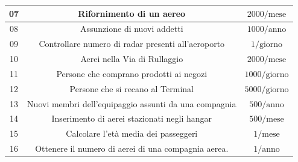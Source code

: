 \begin{tabular}{ | c c c |}
	
	
	
	
	\hline
	\textsf{\small 07} & \textsf{\small Rifornimento di un aereo} & \textsf{\small $ 2000/ \text{mese} $} \\
	\hline
	\textsf{\small 08} & \textsf{\small Assunzione di nuovi addetti} & \textsf{\small $ 1000 / \text{anno}$} \\
	\hline
	\textsf{\small 09} & \textsf{\small Controllare numero di radar presenti all'aeroporto} & \textsf{\small $ 1 / \text{giorno}$} \\
	\hline
	\textsf{\small 10} & \textsf{\small Aerei nella Via di Rullaggio} & \textsf{\small $ 2000 / \text{mese}$} \\
	\hline
	\textsf{\small 11} & \textsf{\small Persone che comprano prodotti ai negozi} & \textsf{\small $ 1000 / \text{giorno} $} \\
	\hline
	\textsf{\small 12} & \textsf{\small Persone che si recano al Terminal} & \textsf{\small $ 5000 / \text{giorno} $} \\
	\hline
	\textsf{\small 13} & \textsf{\small Nuovi membri dell'equipaggio assunti da una compagnia} & \textsf{\small $ 500 / \text{anno}$} \\ %
	\hline
	\textsf{\small 14} & \textsf{\small Inserimento di aerei stazionati negli hangar} & \textsf{\small $ 500 / \text{mese} $} \\ %
	\hline
	\textsf{\small 15} & \textsf{\small Calcolare l'età media dei passeggeri} & \textsf{\small $ 1 / \text{mese} $} \\
	\hline
	\textsf{\small 16} & \textsf{\small Ottenere il numero di aerei di una compagnia aerea.} & \textsf{\small $ 1 / \text{anno} $} \\

\end{tabular}
